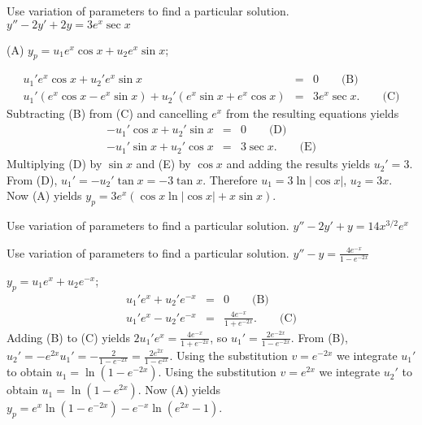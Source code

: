 \documentclass{ximera}
\begin{document}
\begin{problem}\label{exer:5.7.4} Use variation of parameters to find a particular solution. $y''-2y'+2y=3e^x \sec x$

\begin{solution}
(A) $y_p=u_1e^x\cos x+u_2e^x\sin x$;

\begin{eqnarray*}
u_1'e^x\cos x+u_2'e^x\sin
x&=&0\qquad\text{(B)} \\ %
u_1'(e^x\cos x-e^x\sin x)+u_2'(e^x\sin x+e^x\cos x)&=&3e^x\sec x. \qquad\text{(C)}
\end{eqnarray*}
Subtracting (B)  from (C) and
cancelling  $e^x$ from the resulting equations yields
\begin{eqnarray*}
-u_1'\cos x+u_2'\sin x&=&0\qquad\text{(D)}\\ %
-u_1'\sin x+u_2'\cos x&=&3\sec x.\qquad\text{(E)} %
 \end{eqnarray*}
 Multiplying (D) by $\sin x$ and
 (E) by $\cos x$
and adding the results yields $u_2'=3$. From (D),
$u_1'=-u_2'\tan x=-3\tan x$. Therefore $u_1=3\ln|\cos x|$, $u_2=3x$.
Now (A) yields $y_p=3e^x(\cos x \ln |\cos x|+x\sin x)$.

\end{solution}
\end{problem}

\begin{problem}\label{exer:5.7.5} Use variation of parameters to find a particular solution. $y''-2y'+y=14x^{3/2}e^x$
\end{problem}

\begin{problem}\label{exer:5.7.6} Use variation of parameters to find a particular solution. $y''-y=\frac{4e^{-x}}{1-e^{-2x}}$

\begin{solution}
    $y_p=u_1e^x+u_2e^{-x}$;
\setcounter{equation}{1}
\begin{eqnarray*}
u_1'e^x+u_2'e^{-x}&=&0\qquad\text{(B)}\\ %
u_1'e^x-u_2'e^{-x}&=&\frac{4e^{-x}}{ 1+e^{-2x}}.\qquad\text{(C)} %
\end{eqnarray*}
Adding (B) to (C) yields
$2u_1'e^x=\frac{4e^{-x}}{ 1+e^{-2x}}$, so $u_1'=\frac{2e^{-2x}}{
1-e^{-2x}}$. From (B),
$u_2'=-e^{2x}u_1'=-\frac{2}{1-e^{-2x}}=\frac{2e^{2x}}{1-e^{2x}}$.
Using the substitution $v=e^{-2x}$ we integrate $u_1'$ to obtain
$u_1=\ln(1-e^{-2x})$. Using the substitution $v=e^{2x}$ we integrate
$u_2'$ to obtain $u_1=\ln(1-e^{2x})$. Now (A) yields
$y_p=e^x\ln(1-e^{-2x})-e^{-x}\ln(e^{2x}-1)$.

\end{solution}
\end{problem}
\end{document}
